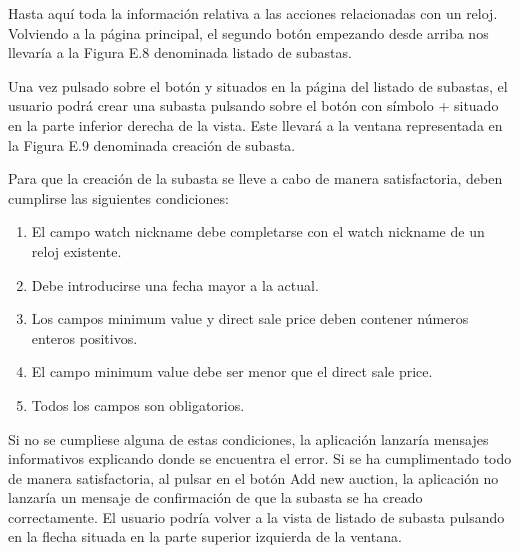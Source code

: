 	
	Hasta aquí toda la información relativa a las acciones relacionadas con un reloj. Volviendo a la página principal, el segundo botón empezando desde arriba nos llevaría a la Figura E.8 denominada listado de subastas.

	
	Una vez pulsado sobre el botón y situados en la página del listado de subastas, el usuario podrá crear una subasta pulsando sobre el botón con símbolo + situado en la parte inferior derecha de la vista. Este llevará a la ventana representada en la Figura E.9 denominada creación de subasta.


	Para que la creación de la subasta se lleve a cabo de manera satisfactoria, deben cumplirse las siguientes condiciones:
	\begin{enumerate}
		\item El campo watch nickname debe completarse con el watch nickname de un reloj existente.
		\item Debe introducirse una fecha mayor a la actual.
		\item Los campos minimum value y direct sale price deben contener números enteros positivos.
		\item El campo minimum value debe ser menor que el direct sale price.
		\item Todos los campos son obligatorios.
	\end{enumerate}
	
	Si no se cumpliese alguna de estas condiciones, la aplicación lanzaría mensajes informativos explicando donde se encuentra el error. Si se ha cumplimentado todo de manera satisfactoria, al pulsar en el botón Add new auction, la aplicación no lanzaría un mensaje de confirmación de que la subasta se ha creado correctamente. El usuario podría volver a la vista de listado de subasta pulsando en la flecha situada en la parte superior izquierda de la ventana.
	
